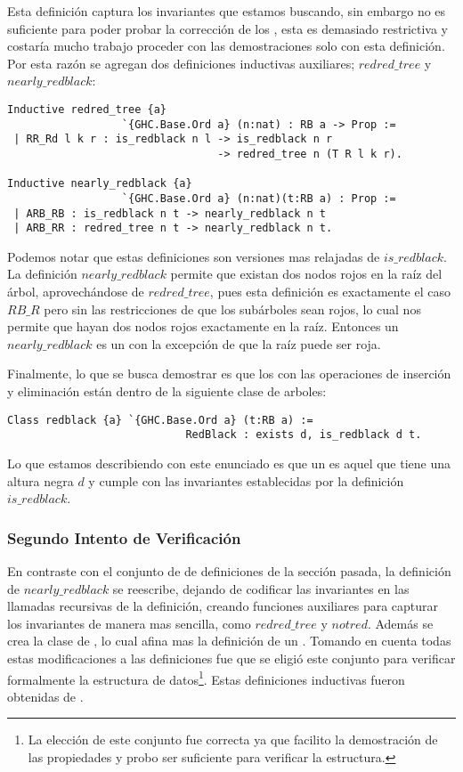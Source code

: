 Esta definici\'on captura los invariantes que estamos buscando, sin embargo no es suficiente para
poder probar la correcci\'on de los {\arns}, esta es demasiado restrictiva y costaría mucho
trabajo proceder con las demostraciones solo con esta definici\'on. Por esta razón se agregan dos
definiciones inductivas auxiliares; $redred\_tree$ y $nearly\_redblack$:

\begin{verbatim}
Inductive redred_tree {a}
                  `{GHC.Base.Ord a} (n:nat) : RB a -> Prop :=
 | RR_Rd l k r : is_redblack n l -> is_redblack n r
                                 -> redred_tree n (T R l k r).

Inductive nearly_redblack {a}
                  `{GHC.Base.Ord a} (n:nat)(t:RB a) : Prop :=
 | ARB_RB : is_redblack n t -> nearly_redblack n t
 | ARB_RR : redred_tree n t -> nearly_redblack n t.
\end{verbatim}

Podemos notar que estas definiciones son versiones mas relajadas de $is\_redblack$. La
definici\'on $nearly\_redblack$ permite que existan dos nodos rojos en la ra\'iz del \'arbol,
aprovech\'andose de $redred\_tree$, pues esta definici\'on es exactamente el caso $RB\_R$ pero sin
las restricciones de que los sub\'arboles sean rojos, lo cual nos permite que hayan dos nodos
rojos exactamente en la ra\'iz. Entonces un $nearly\_redblack$ es un {\arn} con la excepci\'on de
que la ra\'iz puede ser roja.

Finalmente, lo que se busca demostrar es que los {\arns} con las operaciones de inserci\'on y
eliminaci\'on están dentro de la siguiente clase de arboles:

\begin{verbatim}
Class redblack {a} `{GHC.Base.Ord a} (t:RB a) :=
                            RedBlack : exists d, is_redblack d t.
\end{verbatim}

Lo que estamos describiendo con este enunciado es que un {\arn} es aquel que tiene una altura
negra $d$ y cumple con las invariantes establecidas por la definici\'on $is\_redblack$.

\subsubsection{Segundo Intento de Verificaci\'on}
En contraste con el conjunto de de definiciones de la secci\'on pasada, la definici\'on de
$nearly\_redblack$ se reescribe, dejando de codificar las invariantes en las llamadas recursivas
de la definición, creando funciones auxiliares para capturar los invariantes de manera mas
sencilla, como $redred\_tree$ y $notred$. Además se crea la clase de {\arns}, lo cual afina mas la
definici\'on de un {\arn}. Tomando en cuenta todas estas modificaciones a las definiciones fue que
se eligió este conjunto para verificar formalmente la estructura de datos\footnote{La elecci\'on
de este conjunto fue correcta ya que facilito la demostraci\'on de las propiedades y probo ser
suficiente para verificar la estructura.}.
Estas definiciones inductivas fueron obtenidas de \cite{MSetRBT}.
